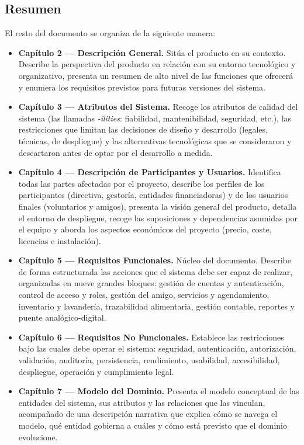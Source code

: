 \newpage

\subsection{Resumen}
El resto del documento se organiza de la siguiente manera:
\begin{itemize}
  \item \textbf{Capítulo 2 — Descripción General.} Sitúa el producto en su contexto.
  Describe la perspectiva del producto en relación con su entorno tecnológico y
  organizativo, presenta un resumen de alto nivel de las funciones que ofrecerá
  y enumera los requisitos previstos para futuras versiones del sistema.

  \item \textbf{Capítulo 3 — Atributos del Sistema.} Recoge los atributos de calidad del
  sistema (las llamadas \textit{-ilities}: fiabilidad, mantenibilidad, seguridad,
  etc.), las restricciones que limitan las decisiones de diseño y desarrollo
  (legales, técnicas, de despliegue) y las alternativas tecnológicas que se
  consideraron y descartaron antes de optar por el desarrollo a medida.

  \item \textbf{Capítulo 4 — Descripción de Participantes y Usuarios.} Identifica todas
  las partes afectadas por el proyecto, describe los perfiles de los
  participantes (directiva, gestoría, entidades financiadoras) y de los
  usuarios finales (voluntarios y amigos), presenta la visión general del
  producto, detalla el entorno de despliegue, recoge las suposiciones y
  dependencias asumidas por el equipo y aborda los aspectos económicos del
  proyecto (precio, coste, licencias e instalación).

  \item \textbf{Capítulo 5 — Requisitos Funcionales.} Núcleo del documento. Describe de
  forma estructurada las acciones que el sistema debe ser capaz de realizar,
  organizadas en nueve grandes bloques: gestión de cuentas y autenticación,
  control de acceso y roles, gestión del amigo, servicios y agendamiento,
  inventario y lavandería, trazabilidad alimentaria, gestión contable,
  reportes y puente analógico-digital.

  \item \textbf{Capítulo 6 — Requisitos No Funcionales.} Establece las restricciones bajo
  las cuales debe operar el sistema: seguridad, autenticación, autorización,
  validación, auditoría, persistencia, rendimiento, usabilidad, accesibilidad,
  despliegue, operación y cumplimiento legal.

  \item \textbf{Capítulo 7 — Modelo del Dominio.} Presenta el modelo conceptual de las
  entidades del sistema, sus atributos y las relaciones que las vinculan,
  acompañado de una descripción narrativa que explica cómo se navega el
  modelo, qué entidad gobierna a cuáles y cómo está previsto que el dominio
  evolucione.
\end{itemize}